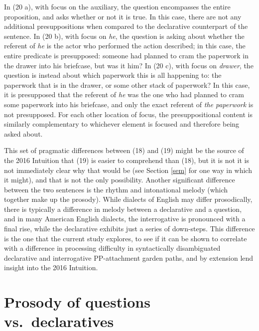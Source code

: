 \documentclass[11pt,oneside]{book}
\begin{document}
In (20 a), with focus on the auxiliary, the question encompasses the entire proposition, and asks whether or not it is true. In this case, there are not any additional presuppositions when compared to the declarative counterpart of the sentence. In (20 b), with focus on \emph{he}, the question is asking about whether the referent of \emph{he} is the actor who performed the action described; in this case, the entire predicate is presupposed: someone had planned to cram the paperwork in the drawer into his briefcase, but was it him? In (20 c), with focus on \emph{drawer}, the question is instead about which paperwork this is all happening to: the paperwork that is in the drawer, or some other stack of paperwork? In this case, it is presupposed that the referent of \emph{he} was the one who had planned to cram some paperwork into his briefcase, and only the exact referent of \emph{the paperwork} is not presupposed. For each other location of focus, the presuppositional content is similarly complementary to whichever element is focused and therefore being asked about.

This set of pragmatic differences between (18) and (19) might be the source of the 2016 Intuition that (19) is easier to comprehend than (18), but it is not it is not immediately clear why that would be (see Section \ref{sem} for one way in which it might), and that is not the only possibility. Another significant difference between the two sentences is the rhythm and intonational melody (which together make up the prosody). While dialects of English may differ prosodically, there is typically a difference in melody between a declarative and a question, and in many American English dialects, the interrogative is pronounced with a final rise, while the declarative exhibits just a series of down-steps. This difference is the one that the current study explores, to see if it can be shown to correlate with a difference in processing difficulty in syntactically disambiguated declarative and interrogative PP-attachment garden paths, and by extension lend insight into the 2016 Intuition.

\hypertarget{prosody-of-questions-vs.-declaratives}{%
\section{Prosody of questions vs.~declaratives}\label{prosody-of-questions-vs.-declaratives}}
\end{document}
